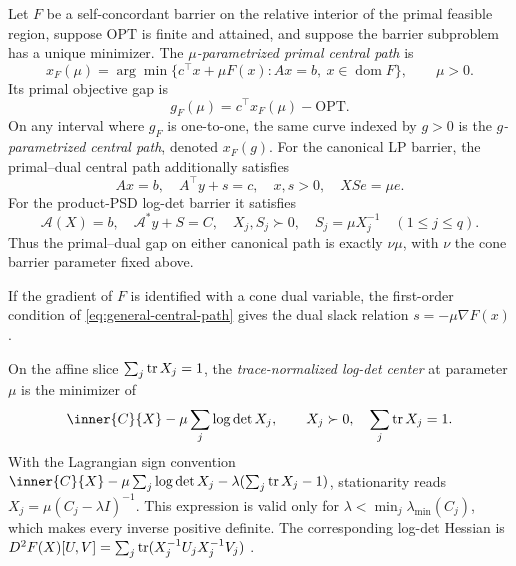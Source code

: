 \begin{definition}
\label{def:central-path}
Let $F$ be a self-concordant barrier on the relative interior of the primal
feasible region, suppose $\mathrm{OPT}$ is finite and attained, and suppose
the barrier subproblem has a unique minimizer.
The \emph{$\mu$-parametrized primal central path} is
\begin{equation}
 x_F(\mu)=\arg\min\{c^\top x+\mu F(x):Ax=b,\ x\in\operatorname{dom}F\},
 \qquad \mu>0.
 \label{eq:general-central-path}
\end{equation}
Its primal objective gap is
\begin{equation}
 g_F(\mu)=c^\top x_F(\mu)-\mathrm{OPT}.
 \label{eq:objective-gap-g}
\end{equation}
On any interval where $g_F$ is one-to-one, the same curve indexed by
$g>0$ is the \emph{$g$-parametrized central path}, denoted $x_F(g)$.
For the canonical LP barrier, the primal--dual central path additionally
satisfies
\begin{equation}
 Ax=b,\quad A^\top y+s=c,\quad x,s>0,\quad XSe=\mu e.
 \label{eq:lp-central-path}
\end{equation}
For the product-PSD log-det barrier it satisfies
\begin{equation}
 \mathcal A(X)=b,\quad \mathcal A^*y+S=C,\quad
 X_j,S_j\succ0,\quad S_j=\mu X_j^{-1}\quad(1\leq j\leq q).
 \label{eq:sdp-central-path}
\end{equation}
Thus the primal--dual gap on either canonical path is exactly $\nu\mu$, with
$\nu$ the cone barrier parameter fixed above.
\end{definition}

If the gradient of $F$ is identified with a cone dual variable, the first-order
condition of \eqref{eq:general-central-path} gives the dual slack relation
$s=-\mu\nabla F(x)$.

\begin{definition}
\label{def:trace-logdet-center}
On the affine slice $\sum_j\operatorname{tr} X_j=1$, the \emph{trace-normalized log-det
center} at parameter $\mu$ is the minimizer of
\begin{equation}
 \inner{C}{X}-\mu\sum_j\log\det X_j,
 \qquad X_j\succ0,\quad \sum_j\tr X_j=1.
 \label{eq:trace-logdet-center}
\end{equation}
With the Lagrangian sign convention
$\inner{C}{X}-\mu\sum_j\log\det X_j-
\lambda(\sum_j\tr X_j-1)$, stationarity reads
$X_j=\mu(C_j-\lambda I)^{-1}$.  This expression is valid only for
$\lambda<\min_j\lambda_{\min}(C_j)$, which makes every inverse positive definite.
The corresponding log-det Hessian is
$D^2F(X)[U,V]=\sum_j\operatorname{tr}(X_j^{-1}U_jX_j^{-1}V_j)$
\cite{boyd2004-convex-optimization}.
\end{definition}


